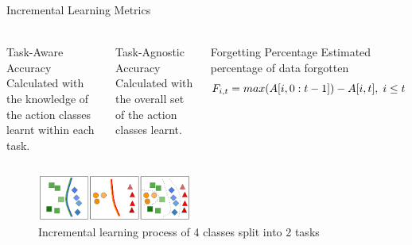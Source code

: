 \documentclass[aspectratio=169, xcolor=dvipsnames]{beamer}
\begin{document}
\begin{frame}{Incremental Learning Metrics}
      \framesubtitle{}%
      
      \vspace{-0.35cm}
      \begin{columns}
      \begin{block}{Task-Aware Accuracy}
            \small Calculated with the knowledge of the action classes learnt within each task.
      \end{block}
      \begin{block}{Task-Agnostic Accuracy}
            \small Calculated with the overall set of the action classes learnt.
      \end{block}
      
      \begin{block}{Forgetting Percentage}
            \small Estimated percentage of data forgotten
            \begin{equation}
            \centering
            F_{i, t} = max(A[i, 0:t-1]) - A[i, t], \; i\leq t
            \end{equation}
      \end{block}
      
      \end{columns}
      \vfill
      \begin{figure}[ht!]
            \centering
            \includegraphics[width=0.45\textwidth]{images/IL_tasks}
            \caption{Incremental learning process of 4 classes split into 2 tasks\footnotemark}
      \end{figure} 
\end{frame}
\end{document}
